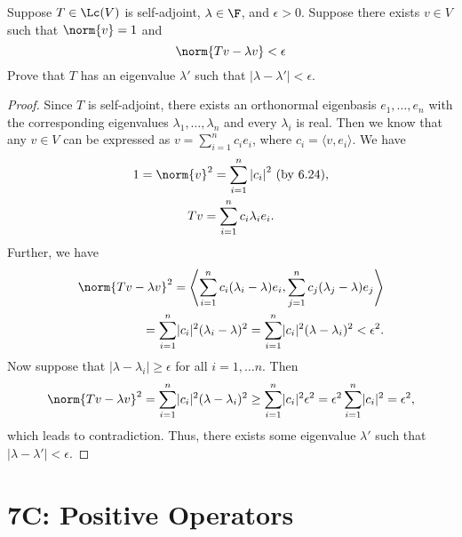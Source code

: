 \documentclass{extarticle}
\begin{document}
\begin{problem}{23}
    Suppose \(T \in \Lc(V)\) is self-adjoint, \(\lambda \in \F\), and \(\epsilon > 0\). Suppose there
    exists \(v \in V\) such that \(\norm{v} = 1\) and
    \[\norm{Tv - \lambda v} < \epsilon\]
    Prove that \(T\) has an eigenvalue \(\lambda'\) such that \(|\lambda - \lambda'| < \epsilon\).
\end{problem}

\begin{proof}
Since \(T\) is self-adjoint, there exists an orthonormal eigenbasis \(e_1, \ldots, e_n\)
with the corresponding eigenvalues \(\lambda_1, \ldots, \lambda_n\) and every \( \lambda_i \) is real.
Then we know that any \(v \in V\) can be expressed as \(v = \sum_{i=1}^{n} c_i e_i\), where
\( c_i = \langle v, e_i \rangle \). We have
\begin{gather*}
    1 = \norm{v}^2 = \sum_{i=1}^{n}{\lvert c_i \rvert}^2 ~ \mathrm{(by \ 6.24)}, \\
    T v = \sum_{i=1}^{n} c_i \lambda_i e_i.
\end{gather*}
Further, we have
\begin{align*}
    \norm{T v - \lambda v}^2 =
    \left\langle \sum_{i=1}^{n} c_i (\lambda_i - \lambda) e_i,
    \sum_{j=1}^{n} c_j (\lambda_j - \lambda) e_j\right\rangle
    \\ =
    \sum_{i=1}^{n} \lvert c_i \rvert^2 (\lambda_i - \lambda)^2
    = \sum_{i=1}^{n} \lvert c_i \rvert^2 (\lambda - \lambda_i)^2 < \epsilon^2.
\end{align*}
Now suppose that \(|\lambda - \lambda_i| \ge \epsilon\) for all \( i = 1, \dots n \). Then
\begin{align*}
    \norm{T v - \lambda v}^2 = \sum_{i=1}^{n} \lvert c_i \rvert^2 (\lambda - \lambda_i)^2
    \ge \sum_{i=1}^{n} \lvert c_i \rvert^2 \epsilon^2 =
    \epsilon^2 \sum_{i=1}^{n} \lvert c_i \rvert^2
    = \epsilon^2,
\end{align*}
which leads to contradiction. Thus, there exists some eigenvalue \( \lambda' \) such that
\(|\lambda - \lambda'| < \epsilon\).
\end{proof}


\newpage
\section*{7C: Positive Operators}
\end{document}
